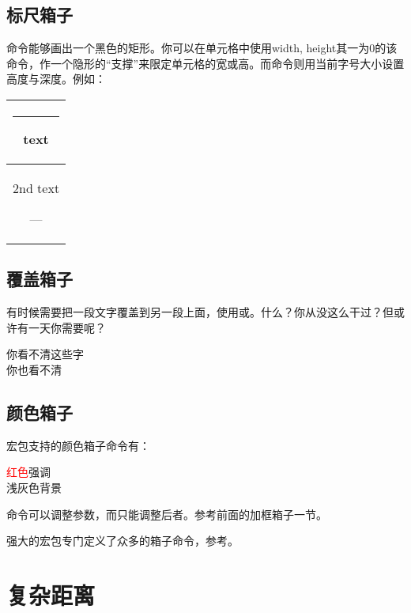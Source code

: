 \subsection{标尺箱子}
命令能够画出一个黑色的矩形。你可以在单元格中使用width, height其一为0的该命令，作一个隐形的“支撑”来限定单元格的宽或高。而命令则用当前字号大小设置高度与深度。例如：

\begin{codeshow}
\begin{tabular}{|c|}
  \hline
  \rule[-1em]{1em}{1ex}text
  \rule{0pt}{38pt} \\
  \hline
  2nd text\strut--- \\
  \hline
\end{tabular}
\end{codeshow}

\subsection{覆盖箱子}
有时候需要把一段文字覆盖到另一段上面，使用或。什么？你从没这么干过？但或许有一天你需要呢？

\begin{codeshow}
你看不清这些字\\
你也看不清
\end{codeshow}

\subsection{颜色箱子}
\label{subsec:colorbox}
宏包支持的颜色箱子命令有：

\begin{codeshow}
\textcolor{red}{红色}强调\\
\colorbox[gray]{0.95}{浅灰色背景} \\
\end{codeshow}

命令可以调整参数，而只能调整后者。参考前面的加框箱子一节。

强大的宏包专门定义了众多的箱子命令，参考。

\section{复杂距离}
\label{sec:hvspace}
